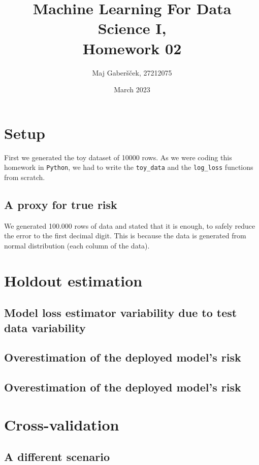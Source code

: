 \documentclass{article}
\title{Machine Learning For Data Science I, \\[0.1cm] Homework 02}
\author{Maj Gaberšček, 27212075}
\date{March 2023}
\begin{document}
\maketitle

\section{Setup}

First we generated the toy dataset of 10000 rows. As we were coding this homework in \texttt{Python}, we had to write the \texttt{toy\_data} and the \texttt{log\_loss} functions from scratch.

\subsection{A proxy for true risk}

We generated 100.000 rows of data and stated that it is enough, to safely reduce the error to the first decimal digit. This is because the data is generated from normal distribution (each column of the data). 

\section{Holdout estimation}

\subsection{Model loss estimator variability due to test data variability}

\subsection{Overestimation of the deployed model’s risk}

\subsection{Overestimation of the deployed model’s risk}

\section{Cross-validation}

\subsection{A different scenario}

\printbibliography
\end{document}
